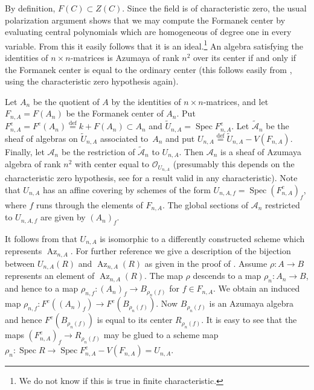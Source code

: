 \documentclass{amsart}
\numberwithin{equation}{section}
\let\cal\mathcal
\theoremstyle{definition}
\theoremstyle{remark}
\begin{document}
By definition, $F(C)\subset Z(C)$. Since the field is of characteristic zero, the usual polarization argument \cite{Procesi3} shows that we may compute the Formanek center by evaluating central polynomials which are homogeneous of degree one in every variable. From this it easily follows that it is an ideal.\footnote{We do not know if this is true in finite characteristic.} An algebra satisfying the identities 
of $n\times n$-matrices is Azumaya of rank $n^2$ over its center if and only if the Formanek center is equal to the ordinary center
(this follows easily from \cite[Ch VIII, Th 2.1(6)]{Procesi2}, using the characteristic zero hypothesis again).

Let ${A}_n$
be the quotient of $A$ by the identities of $n\times n$-matrices, and let $F_{n,A}=F(A_n)$ be the Formanek center
of $A_n$. Put $F^e_{n,A}=F^e(A_n)\overset{\text{def}}{=}k+F(A_n)\subset A_n$ and
$\tilde{U}_{n,A}={\operatorname {Spec}} F^e_{n,A}$. Let $\tilde{{\cal A}}_n$ be the 
sheaf of algebras on $\tilde{U}_{n,A}$ associated to~${A}_n$ and put $U_{n,A}\overset{\text{def}}{=}
\tilde{U}_{n,A}-V(F_{n,A})$. Finally, let ${{\cal A}}_n$ be the restriction of $\tilde{{\cal A}}_n$
to $U_{n,A}$. Then ${{\cal A}}_n$ is a sheaf of Azumaya algebra of rank $n^2$ with center equal to ${{\cal O}}_{U_{n,A}}$ (presumably this depends 
on the characteristic zero hypothesis, see \cite[Ch VIII, Cor.\ 2.3]{Procesi2} for a result valid in any characteristic). Note that $U_{n,A}$ has an affine covering by
schemes of the form
$U_{n,A,f}={\operatorname {Spec}} (F^e_{n,A})_f$, where
$f$ runs through the elements of $F_{n,A}$. The global sections of ${{\cal A}}_n$
restricted to $U_{n,A,f}$ are given by $(A_{n})_f$.

\medskip

It follows from \cite[Ch VIII, Thm 2.2]{Procesi2}   that
 $U_{n,A}$  is isomorphic to a differently constructed scheme
which
represents ${\operatorname{Az}}_{n,A}$.   For further reference we give a description of the bijection
between
$U_{n,A}(R)$ and
${\operatorname{Az}}_{n,A}(R)$ as given in the proof of \cite[Ch VIII, Thm 2.2]{Procesi2}. Assume
$\rho:A{\rightarrow} B$ 
represents an element of ${\operatorname{Az}}_{n,A}(R)$. The map $\rho$ descends to a map
$\rho_n:A_n{\rightarrow} B$, and hence to a map $\rho_{n,f}:(A_{n})_f{\rightarrow} B_{\rho_n(f)}$ for $f\in F_{n,A}$. We obtain
an induced map  $\rho_{n,f}:F^e((A_{n})_f){\rightarrow} F^e(B_{\rho_n(f)})$.
Now $B_{\rho_n(f)}$ is an Azumaya algebra and hence $F^e(B_{\rho_n(f)})$ is equal to its center 
$R_{\rho_n(f)}$. It is easy to see that
the maps   $(F^e_{n,A})_f{\rightarrow} R_{\rho_n(f)}$ may be glued to a scheme map
$\rho_n:{\operatorname {Spec}} R{\rightarrow} {\operatorname {Spec}} F^e_{n,A}-V(F_{n,A})=U_{n,A}$.
\end{document}
